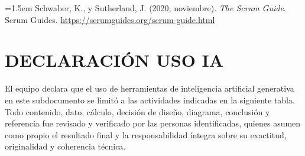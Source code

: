 \documentclass[11pt]{article}
\begin{document}
\noindent\hangindent=1.5em Schwaber, K., y Sutherland, J. (2020, noviembre). \emph{The Scrum Guide}. Scrum Guides. \url{https://scrumguides.org/scrum-guide.html}

\section{DECLARACIÓN USO IA}\label{declaracion-de-uso-de-ia}

El equipo declara que el uso de herramientas de inteligencia artificial generativa en este subdocumento se limitó a las actividades indicadas en la siguiente tabla. Todo contenido, dato, cálculo, decisión de diseño, diagrama, conclusión y referencia fue revisado y verificado por las personas identificadas, quienes asumen como propio el resultado final y la responsabilidad íntegra sobre su exactitud, originalidad y coherencia técnica.
\end{document}

